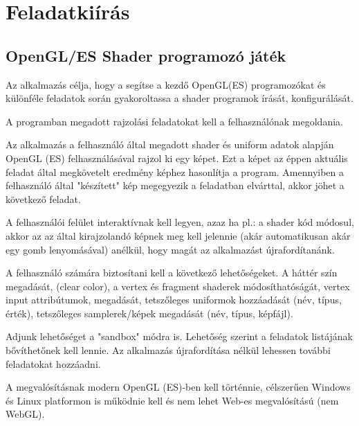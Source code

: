 \chapter*{Feladatkiírás}

\section*{OpenGL/ES Shader programozó játék}

Az alkalmazás célja, hogy a segítse a kezdő OpenGL(ES) programozókat és
különféle feladatok során gyakoroltassa a shader programok írását, konfigurálását.

A programban megadott rajzolási feladatokat kell a felhasználónak megoldania.

Az alkalmazás a felhasználó által megadott shader és uniform adatok alapján
OpenGL (ES) felhasználásával rajzol ki egy képet. Ezt a képet az éppen aktuális
feladat által megkövetelt eredmény képhez hasonlítja a program. Amennyiben
a felhasználó által "készített" kép megegyezik a feladatban elvárttal, akkor jöhet
a következő feladat.

A felhasználói felület interaktívnak kell legyen, azaz ha pl.: a shader kód
módosul, akkor az az által kirajzolandó képnek meg kell jelennie
(akár automatikusan akár egy gomb lenyomásával) anélkül, hogy magát az alkalmazást
újrafordítanánk.

A felhasználó számára biztosítani kell a következő lehetőségeket. A háttér szín megadását, (clear color), a vertex és fragment shaderek módosíthatóságát, vertex input attribútumok, megadását, tetszőleges uniformok hozzáadását (név, típus, érték), tetszőleges samplerek/képek megadását (név, típus, képfájl).

Adjunk lehetőséget a "sandbox" módra is. Lehetőség szerint a feladatok listájának bővíthetőnek
kell lennie. Az alkalmazás újrafordítása nélkül lehessen további feladatokat hozzáadni.

A megvalósításnak modern OpenGL (ES)-ben kell történnie, célszerűen Windows és Linux platformon
is működnie kell és nem lehet Web-es megvalósítású (nem WebGL).